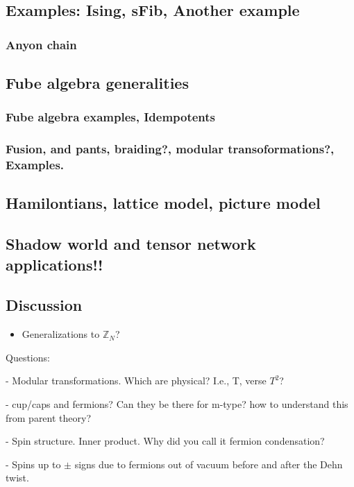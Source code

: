 \documentclass[12pt,a4paper]{article}
\begin{document}
\subsection{Examples: Ising, sFib, Another example}
\subsubsection{Anyon chain}
\subsection{Fube algebra generalities}
\subsubsection{Fube algebra examples, Idempotents}
\subsubsection{Fusion, and pants, braiding?, modular transoformations?, Examples.}
\subsection{Hamilontians, lattice model, picture model}
\subsection{Shadow world and tensor network applications!!}
\subsection{Discussion}
\begin{itemize}
    \item Generalizations to $\mathbb{Z}_N$?
\end{itemize}

Questions:

- Modular transformations. Which are physical? I.e., T, verse $T^2$?

- cup/caps and fermions? Can they be there for m-type? how to understand this from parent theory?

- Spin structure. Inner product. Why did you call it fermion condensation?

- Spins up to $\pm$ signs due to fermions out of vacuum before and after the Dehn twist. 
\end{document}
